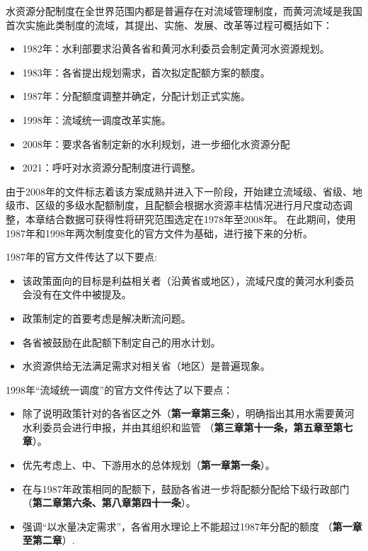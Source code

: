水资源分配制度在全世界范围内都是普遍存在对流域管理制度，而黄河流域是我国首次实施此类制度的流域，其提出、实施、发展、改革等过程可概括如下\cite{wang2019b}：%
\begin{itemize}
    \item 1982年：水利部要求沿黄各省和黄河水利委员会制定黄河水资源规划\cite{wang2019, wang2019a}。
    \item 1983年：各省提出规划需求，首次拟定配额方案的额度。
    \item 1987年：分配额度调整并确定，分配计划正式实施。
    \item 1998年：流域统一调度改革实施。
    \item 2008年：要求各省制定新的水利规划，进一步细化水资源分配\cite{wang2019,wang2019a}
    \item 2021：呼吁对水资源分配制度进行调整。
\end{itemize}

由于2008年的文件标志着该方案成熟并进入下一阶段，开始建立流域级、省级、地级市、区级的多级水配额制度，且配额会根据水资源丰枯情况进行月尺度动态调整，本章结合数据可获得性将研究范围选定在1978年至2008年。
在此期间，使用1987年和1998年两次制度变化的官方文件为基础，进行接下来的分析。

1987年的官方文件传达了以下要点:

\begin{itemize}
	\item 该政策面向的目标是利益相关者（沿黄省或地区），流域尺度的黄河水利委员会没有在文件中被提及。
	\item 政策制定的首要考虑是解决断流问题。
	\item 各省被鼓励在此配额下制定自己的用水计划。
	\item 水资源供给无法满足需求对相关省（地区）是普遍现象。
\end{itemize}

1998年“流域统一调度”的官方文件传达了以下要点：

\begin{itemize}
	\item 除了说明政策针对的各省区之外（\textbf{第一章第三条}），明确指出其用水需要黄河水利委员会进行申报，并由其组织和监管 （\textbf{第三章第十一条，第五章至第七章}）。
	\item 优先考虑上、中、下游用水的总体规划（\textbf{第一章第一条}）。
	\item 在与1987年政策相同的配额下，鼓励各省进一步将配额分配给下级行政部门（\textbf{第二章第六条、第八章第四十一条}）。
	\item 强调“以水量决定需求”，各省用水理论上不能超过1987年分配的额度 （\textbf{第一章至第二章}）.
\end{itemize}

